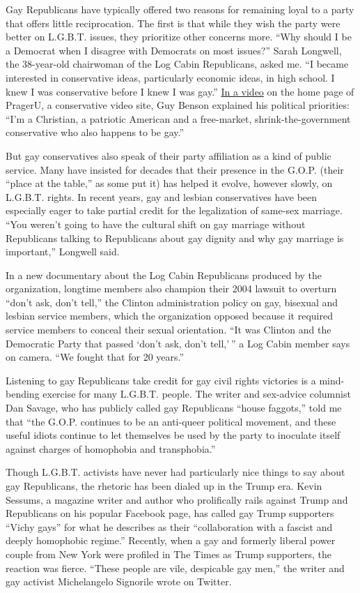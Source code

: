 Gay Republicans have typically offered two reasons for remaining loyal
to a party that offers little reciprocation. The first is that while
they wish the party were better on L.G.B.T. issues, they prioritize
other concerns more. ``Why should I be a Democrat when I disagree with
Democrats on most issues?'' Sarah Longwell, the 38-year-old chairwoman
of the Log Cabin Republicans, asked me. ``I became interested in
conservative ideas, particularly economic ideas, in high school. I knew
I was conservative before I knew I was gay.''
\href{https://www.prageru.com/videos/im-gayconservativeso-what}{In a
video} on the home page of PragerU, a conservative video site, Guy
Benson explained his political priorities: ``I'm a Christian, a
patriotic American and a free-market, shrink-the-government conservative
who also happens to be gay.''

But gay conservatives also speak of their party affiliation as a kind of
public service. Many have insisted for decades that their presence in
the G.O.P. (their ``place at the table,'' as some put it) has helped it
evolve, however slowly, on L.G.B.T. rights. In recent years, gay and
lesbian conservatives have been especially eager to take partial credit
for the legalization of same-sex marriage. ``You weren't going to have
the cultural shift on gay marriage without Republicans talking to
Republicans about gay dignity and why gay marriage is important,''
Longwell said.

In a new documentary about the Log Cabin Republicans produced by the
organization, longtime members also champion their 2004 lawsuit to
overturn ``don't ask, don't tell,'' the Clinton administration policy on
gay, bisexual and lesbian service members, which the organization
opposed because it required service members to conceal their sexual
orientation. ``It was Clinton and the Democratic Party that passed
`don't ask, don't tell,' '' a Log Cabin member says on camera. ``We
fought that for 20 years.''

Listening to gay Republicans take credit for gay civil rights victories
is a mind-bending exercise for many L.G.B.T. people. The writer and
sex-advice columnist Dan Savage, who has publicly called gay Republicans
``house faggots,'' told me that ``the G.O.P. continues to be an
anti-queer political movement, and these useful idiots continue to let
themselves be used by the party to inoculate itself against charges of
homophobia and transphobia.''

Though L.G.B.T. activists have never had particularly nice things to say
about gay Republicans, the rhetoric has been dialed up in the Trump era.
Kevin Sessums, a magazine writer and author who prolifically rails
against Trump and Republicans on his popular Facebook page, has called
gay Trump supporters ``Vichy gays'' for what he describes as their
``collaboration with a fascist and deeply homophobic regime.'' Recently,
when a gay and formerly liberal power couple from New York were profiled
in The Times as Trump supporters, the reaction was fierce. ``These
people are vile, despicable gay men,'' the writer and gay activist
Michelangelo Signorile wrote on Twitter.

